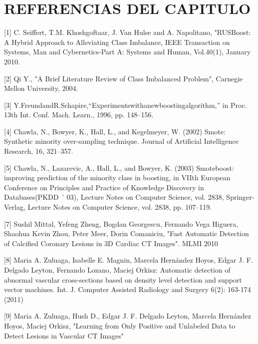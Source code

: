 \section{REFERENCIAS DEL CAPITULO}

[1] C. Seiffert, T.M. Khoshgoftaar, J. Van Hulse and A. Napolitano, "RUSBoost: A Hybrid Approach to Alleviating Class Imbalance, IEEE Transaction on Systems, Man and Cybernetics-Part A: Systems and Human, Vol.40(1), January 2010.

[2] Qi Y., "A Brief Literature Review of Class Imbalanced Problem", Carnegie Mellon University, 2004.

[3] Y.FreundandR.Schapire,“Experimentswithanewboostingalgorithm,” in Proc. 13th Int. Conf. Mach. Learn., 1996, pp. 148–156.

[4] Chawla, N., Bowyer, K., Hall, L., and Kegelmeyer, W. (2002) Smote: Synthetic minority over-sampling technique. Journal of Artificial Intelligence Research, 16, 321–357.

[5] Chawla, N., Lazarevic, A., Hall, L., and Bowyer, K. (2003) Smoteboost: improving prediction of the minority class in boosting, in VIIth European Conference on Principles and Practice of Knowledge Discovery in Databases(PKDD ´ 03), Lecture Notes on Computer Science, vol. 2838, Springer-Verlag, Lecture Notes on Computer Science, vol. 2838, pp. 107–119.

[7] Sushil Mittal, Yefeng Zheng, Bogdan Georgescu, Fernando Vega Higuera, Shaohua Kevin Zhou, Peter Meer, Dorin Comaniciu, "Fast Automatic Detection of Calcified Coronary Lesions in 3D Cardiac CT Images". MLMI 2010

[8] Maria A. Zuluaga, Isabelle E. Magnin, Marcela Hernández Hoyos, Edgar J. F. Delgado Leyton, Fernando Lozano, Maciej Orkisz: Automatic detection of abnormal vascular cross-sections based on density level detection and support vector machines. Int. J. Computer Assisted Radiology and Surgery 6(2): 163-174 (2011)

[9] Maria A. Zuluaga, Hush D., Edgar J. F. Delgado Leyton, Marcela Hernández Hoyos, Maciej Orkisz, "Learning from Only Positive and Unlabeled Data to Detect Lesions in Vascular CT Images"

